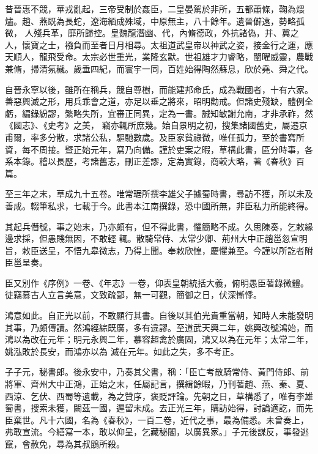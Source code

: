 \begin{pinyinscope}
 昔晉惠不競，華戎亂起，三帝受制於姦臣，二皇晏駕於非所，五都蕭條，鞠為煨燼。趙、燕既為長蛇，遼海緬成殊域，中原無主，八十餘年。遺晉僻遠，勢略孤微，
 人殘兵革，靡所歸控。皇魏龍潛幽、代，內脩德政，外抗諸偽，并、冀之人，懷寶之士，襁負而至者日月相尋。太祖道武皇帝以神武之姿，接金行之運，應天順人，龍飛受命。太宗必世重光，業隆玄默。世祖雄才力睿略，闡曜威靈，農戰兼脩，掃清氛穢。歲垂四紀，而寰宇一同，百姓始得陶然蘇息，欣於堯、舜之代。



 自晉永寧以後，雖所在稱兵，競自尊樹，而能建邦命氏，成為戰國者，十有六家。善惡興滅之形，用兵乖會之道，亦足以垂之將來，昭明勸戒。但諸史殘缺，體例全虧，編錄紛謬，繁略失所，宜審正同異，定為一書。誠知敏謝允南，才非承祚，然《國志》、《史考》之美，
 竊亦輒所庶幾。始自景明之初，搜集諸國舊史，屬遷京甫爾，率多分散，求諸公私，驅馳數歲。及臣家貧祿微，唯任孤力，至於書寫所資，每不周接。暨正始元年，寫乃向備。謹於吏案之暇，草構此書，區分時事，各系本錄。稽以長歷，考諸舊志，刪正差謬，定為實錄，商較大略，著《春秋》百篇。



 至三年之末，草成九十五卷。唯常琚所撰李雄父子據蜀時書，尋訪不獲，所以未及善成。輟筆私求，七載于今。此書本江南撰錄，恐中國所無，非臣私力所能終得。



 其起兵僭號，事之始末，乃亦頗有，但不得此書，懼簡略不成。久思陳奏，乞敕緣邊求採，但愚賤無因，不敢輕
 輒。散騎常侍、太常少卿、荊州大中正趙邕忽宣明旨，敕臣送呈，不悟九皋微志，乃得上聞。奉敕欣惶，慶懼兼至。今謹以所訖者附臣邕呈奏。



 臣又別作《序例》一卷、《年志》一卷，仰表皇朝統括大義，俯明愚臣著錄微體。徒竊慕古人立言美意，文致疏鄙，無一可觀，簡御之日，伏深慚悸。



 鴻意如此。自正光以前，不敢顯行其書。自後以其伯光貴重當朝，知時人未能發明其事，乃頗傳讀。然鴻經綜既廣，多有違謬。至道武天興二年，姚興改號鴻始，而鴻以為改在元年；明元永興二年，慕容超禽於廣固，鴻又以為在元年；太常二年，姚泓敗於長安，而鴻亦以為
 滅在元年。如此之失，多不考正。



 子子元，秘書郎。後永安中，乃奏其父書，稱：「臣亡考散騎常侍、黃門侍郎、前將軍、齊州大中正鴻，正始之末，任屬記言，撰緝餘暇，乃刊著趙、燕、秦、夏、西涼、乞伏、西蜀等遺載，為之贊序，褒貶評論。先朝之日，草構悉了，唯有李雄蜀書，搜索未獲，闕茲一國，遲留未成。去正光三年，購訪始得，討論適訖，而先臣棄世。凡十六國，名為《春秋》，一百二卷，近代之事，最為備悉。未曾奏上，弗敢宣流。今繕寫一本，敢以仰呈，乞藏秘閣，以廣異家。」子元後謀反，事發逃竄，會赦免，尋為其叔鵾所殺。




\end{pinyinscope}
